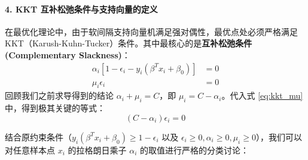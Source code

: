 \documentclass[UTF8]{ctexart}
\numberwithin{equation}{section}
\begin{document}
\paragraph{4. KKT 互补松弛条件与支持向量的定义}

在最优化理论中，由于软间隔支持向量机满足强对偶性，最优点处必须严格满足 KKT（Karush-Kuhn-Tucker）条件。其中最核心的是\textbf{互补松弛条件 (Complementary Slackness)}：
\begin{align}
    \alpha_i [1 - \epsilon_i - y_i(\beta^T x_i + \beta_0)] &= 0 \label{eq:kkt_alpha} \\
    \mu_i \epsilon_i &= 0 \label{eq:kkt_mu}
\end{align}
回顾我们之前求导得到的结论 $\alpha_i + \mu_i = C$，即 $\mu_i = C - \alpha_i$。代入式 \eqref{eq:kkt_mu} 中，得到极其关键的等式：
\begin{equation}
    (C - \alpha_i) \epsilon_i = 0 \label{eq:kkt_combined}
\end{equation}

结合原约束条件（$y_i(\beta^T x_i + \beta_0) \ge 1 - \epsilon_i$ 以及 $\epsilon_i \ge 0, \alpha_i \ge 0, \mu_i \ge 0$），我们可以对任意样本点 $x_i$ 的拉格朗日乘子 $\alpha_i$ 的取值进行严格的分类讨论：
\end{document}
